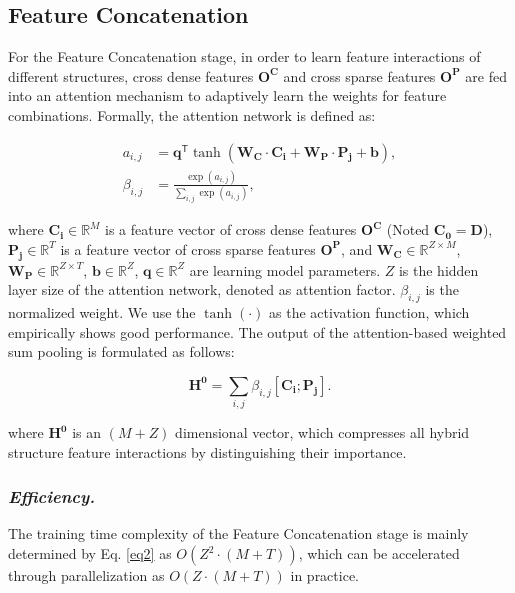 \documentclass[letterpaper]{article} \usepackage{aaai21}  \usepackage{times}  \usepackage{helvet} \usepackage{courier}  \usepackage[hyphens]{url}  \usepackage{graphicx} \urlstyle{rm} \def\UrlFont{\rm}  \usepackage{natbib}  \usepackage{caption} \frenchspacing  \setlength{\pdfpagewidth}{8.5in}  \setlength{\pdfpageheight}{11in}  \usepackage{graphicx}
\begin{document}
\vspace{-0.1cm}
\subsection{Feature Concatenation}
For the Feature Concatenation stage, in order to learn feature interactions of different structures, cross dense features $\bm{O^C}$ and cross sparse features $\bm{O^P}$ are fed into an attention mechanism to adaptively learn the weights for feature combinations. Formally, the attention network is defined as:
\begin{small}
	\begin{equation}
	\begin{aligned}
	a_{i,j} &= \bm{q^{\mathsf{T}}} \tanh ( \bm{W_{C}} \cdot \bm{C_{i}} + \bm{W_{P}} \cdot \bm{P_{j}} + \bm{b} ), \\
	\beta_{i,j} &= \frac{\exp(a_{i,j})}{\sum_{i,j} \exp(a_{i,j})}, 
	\end{aligned}
	\label{eq2}
	\end{equation}
\end{small}where $\bm{C_i} \in \mathbb{R}^M$ is a feature vector of cross dense features $\bm{O^C}$ (Noted $\bm{C_0} = \bm{D}$), $\bm{P_j} \in \mathbb{R}^T$ is a feature vector of cross sparse features $\bm{O^P}$, and $\bm{W_C} \in \mathbb{R}^{Z\times M}$, $\bm{W_P} \in \mathbb{R}^{Z\times T}$, $ \bm{b} \in \mathbb{R}^{Z}$, $\bm{q} \in \mathbb{R}^{Z}$ are learning model parameters. $Z$ is the hidden layer size of the attention network, denoted as attention factor. $\beta_{i,j}$ is the normalized weight. We use the $\tanh(\cdot)$ as the activation function, which empirically shows good performance. The output of the attention-based weighted sum pooling is formulated as follows:
\begin{small}
	\begin{equation}
	\bm{H^0} = \sum_{i,j} \beta_{i,j} [\bm{C_{i}}; \bm{P_{j}} ].
	\end{equation}
\end{small}where $\bm{H^0}$ is an $(M+Z)$ dimensional vector, which compresses all hybrid structure feature interactions by distinguishing their importance. 
\subsubsection{{\em Efficiency.}} The training time complexity of the Feature Concatenation stage is mainly  determined by Eq. \ref{eq2} as $O(Z^{2} \cdot (M+T))$, which can be accelerated through parallelization as $O(Z \cdot (M+T))$ in practice.
\end{document}
